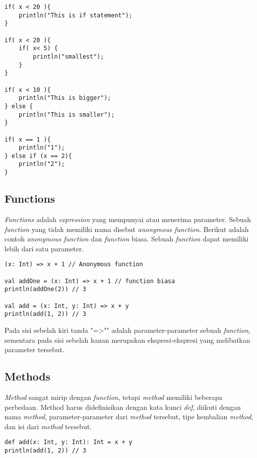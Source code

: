 \begin{verbatim}
if( x < 20 ){
    println("This is if statement");
}

if( x < 20 ){
    if( x< 5) {
        println("smallest");
    }
}

if( x < 10 ){
    println("This is bigger");
} else { 
    println("This is smaller");
}

if( x == 1 ){
    println("1");
} else if (x == 2){ 
    println("2");
}
\end{verbatim}


\subsection{Functions}

\textit{Functions} adalah \textit{expression} yang mempunyai atau menerima parameter. Sebuah \textit{function} yang tidak memiliki nama disebut \textit{anonymous function}. Berikut adalah contoh \textit{anonymous function} dan \textit{function} biasa. Sebuah \textit{function} dapat memiliki lebih dari satu parameter.

\begin{verbatim}
(x: Int) => x + 1 // Anonymous function 

val addOne = (x: Int) => x + 1 // function biasa 
println(addOne(2)) // 3 

val add = (x: Int, y: Int) => x + y 
println(add(1, 2)) // 3 
\end{verbatim}

Pada sisi sebelah kiri tanda "=>"" adalah parameter-parameter sebuah \textit{function}, sementara pada sisi  sebelah kanan merupakan ekspresi-ekspresi yang melibatkan parameter tersebut. \\


\subsection{Methods}

\textit{Method} sangat mirip dengan \textit{function}, tetapi \textit{method} memiliki beberapa perbedaan. Method harus didefinisikan dengan kata kunci \textit{def}, diikuti dengan nama \textit{method}, parameter-parameter dari \textit{method} tersebut, tipe kembalian \textit{method}, dan isi dari \textit{method} tersebut. 

\begin{verbatim}
def add(x: Int, y: Int): Int = x + y 
println(add(1, 2)) // 3 
\end{verbatim}

